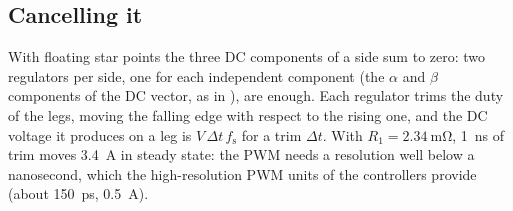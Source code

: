 \documentclass[12pt,a4paper]{scrartcl}
\newcommand{\ped}[1]{_{\mathrm{#1}}}
\begin{document}
\begin{onehalfspace}
\subsection{Cancelling it}
\label{sec:dc_loop}

With floating star points the three DC components of a side sum to zero: two regulators per side, one for each independent component (the $\alpha$ and $\beta$ components of the DC vector, as in \cite{dcbias_note}), are enough. Each regulator trims the duty of the legs, moving the falling edge with respect to the rising one, and the DC voltage it produces on a leg is $V\,\Delta t\,f\ped{s}$ for a trim $\Delta t$. With $R\ped{1} = \SI{2.34}{\milli\ohm}$, \SI{1}{\nano\second} of trim moves \SI{3.4}{\ampere} in steady state: the PWM needs a resolution well below a nanosecond, which the high-resolution PWM units of the controllers provide (about \SI{150}{\pico\second}, \SI{0.5}{\ampere}).


\end{onehalfspace}
\end{document}
